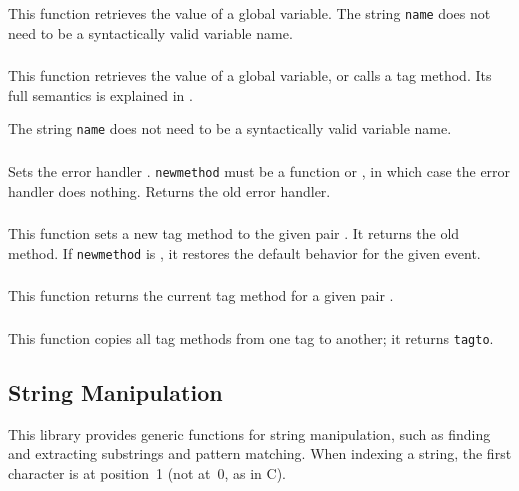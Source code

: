 \subsubsection*{\ff {}}
This function retrieves the value of a global variable.
The string \verb|name| does not need to be a
syntactically valid variable name.

\subsubsection*{\ff {}}
This function retrieves the value of a global variable,
or calls a tag method.
Its full semantics is explained in .

The string \verb|name| does not need to be a
syntactically valid variable name.

\subsubsection*{\ff {}}
\label{pdf-seterrormethod}
Sets the error handler .
\verb|newmethod| must be a function or \nil,
in which case the error handler does nothing.
Returns the old error handler.

\subsubsection*{\ff {}}
This function sets a new tag method to the given pair .
It returns the old method.
If \verb|newmethod| is \nil,
it restores the default behavior for the given event.

\subsubsection*{\ff {}}
This function returns the current tag method
for a given pair .

\subsubsection*{\ff {}}
This function copies all tag methods from one tag to another;
it returns \verb|tagto|.


\subsection{String Manipulation}
This library provides generic functions for string manipulation,
such as finding and extracting substrings and pattern matching.
When indexing a string, the first character is at position~1
(not at~0, as in C).

